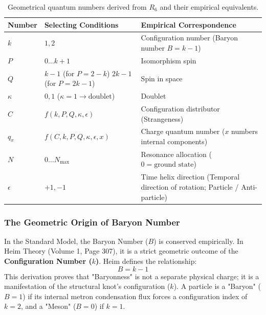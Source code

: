 \documentclass[11pt,a4paper,oneside]{article}
\begin{document}
\begin{table}[htbp]
\centering
\renewcommand{\arraystretch}{1.4}
\begin{tabular}{lll}
\toprule
\textbf{Number} & \textbf{Selecting Conditions} & \textbf{Empirical Correspondence} \\
\midrule
\rowcolor{theoryblue!5}
\textbf{$k$} & $1, 2$ & Configuration number (Baryon number $B = k-1$) \\
\textbf{$P$} & $0 \dots k+1$ & Isomorphism spin \\
\rowcolor{theoryblue!5}
\textbf{$Q$} & $k-1$ (for $P = 2-k$) \newline $2k-1$ (for $P = 2k-1$) & Spin in space \\
\textbf{$\kappa$} & $0, 1$ ($\kappa=1 \to \text{doublet}$) & Doublet \\
\rowcolor{theoryblue!5}
\textbf{$C$} & $f(k, P, Q, \kappa, \epsilon)$ & Configuration distributor (Strangeness) \\
\textbf{$q_x$} & $f(C, k, P, Q, \kappa, \epsilon, x)$ & Charge quantum number ($x$ numbers internal components) \\
\rowcolor{theoryblue!5}
\textbf{$N$} & $0 \dots N_{\max}$ & Resonance allocation ($0 = \text{ground state}$) \\
\textbf{$\epsilon$} & $+1, -1$ & Time helix direction (Temporal direction of rotation; Particle / Anti-particle) \\
\bottomrule
\end{tabular}
\caption{Geometrical quantum numbers derived from $R_6$ and their empirical equivalents.}
\end{table}

\subsubsection{The Geometric Origin of Baryon Number}
In the Standard Model, the Baryon Number ($B$) is conserved empirically. In Heim Theory (Volume 1, Page 307), it is a strict geometric outcome of the \textbf{Configuration Number ($k$)}. Heim defines the relationship:
\begin{equation}
    B = k - 1
\end{equation}
This derivation proves that "Baryonness" is not a separate physical charge; it is a manifestation of the structural knot's configuration ($k$). A particle is a "Baryon" ($B=1$) if its internal metron condensation flux forces a configuration index of $k=2$, and a "Meson" ($B=0$) if $k=1$.
\end{document}
